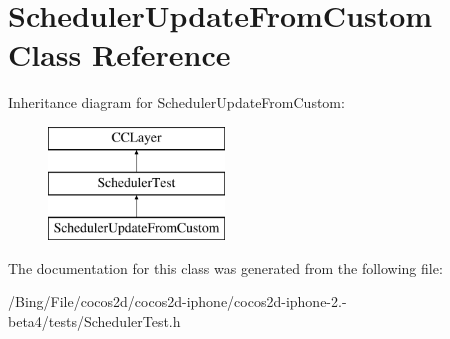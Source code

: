 \hypertarget{interface_scheduler_update_from_custom}{\section{Scheduler\-Update\-From\-Custom Class Reference}
\label{interface_scheduler_update_from_custom}
}
Inheritance diagram for Scheduler\-Update\-From\-Custom\-:\begin{figure}[H]
\begin{center}
\leavevmode
\includegraphics[height=3.000000cm]{interface_scheduler_update_from_custom}
\end{center}
\end{figure}


The documentation for this class was generated from the following file\-:\begin{DoxyCompactItemize}
\item 
/\-Bing/\-File/cocos2d/cocos2d-\/iphone/cocos2d-\/iphone-\/2.-\/beta4/tests/Scheduler\-Test.\-h\end{DoxyCompactItemize}
